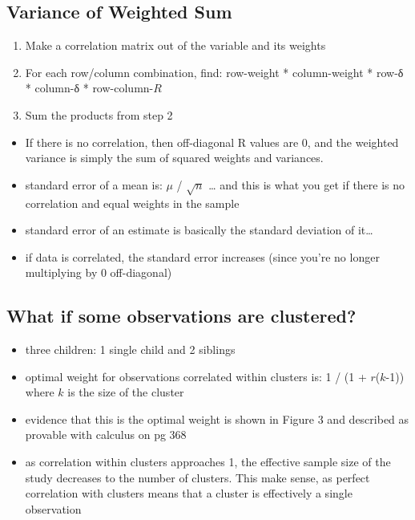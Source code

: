 \documentclass[
]{article}
\providecommand{\tightlist}{%
  \setlength{\itemsep}{0pt}\setlength{\parskip}{0pt}}
\begin{document}
\hypertarget{variance-of-weighted-sum}{%
\subsection{Variance of Weighted Sum}\label{variance-of-weighted-sum}}

\begin{enumerate}
\def\labelenumi{\arabic{enumi}.}
\tightlist
\item
  Make a correlation matrix out of the variable and its weights
\item
  For each row/column combination, find: row-weight * column-weight *
  row-δ * column-δ * row-column-\(R\)
\item
  Sum the products from step 2
\end{enumerate}

\begin{itemize}
\tightlist
\item
  If there is no correlation, then off-diagonal R values are 0, and the
  weighted variance is simply the sum of squared weights and variances.
\item
  standard error of a mean is: \(\mu\) / \(\sqrt{n}\) \ldots{} and this
  is what you get if there is no correlation and equal weights in the
  sample
\item
  standard error of an estimate is basically the standard deviation of
  it\ldots{}
\item
  if data is correlated, the standard error increases (since you're no
  longer multiplying by 0 off-diagonal)
\end{itemize}

\hypertarget{what-if-some-observations-are-clustered}{%
\subsection{What if some observations are
clustered?}\label{what-if-some-observations-are-clustered}}

\begin{itemize}
\tightlist
\item
  three children: 1 single child and 2 siblings
\item
  optimal weight for observations correlated within clusters is: 1 / (1
  + \(r\)(\(k\)-1)) where \(k\) is the size of the cluster
\item
  evidence that this is the optimal weight is shown in Figure 3 and
  described as provable with calculus on pg 368
\item
  as correlation within clusters approaches 1, the effective sample size
  of the study decreases to the number of clusters. This make sense, as
  perfect correlation with clusters means that a cluster is effectively
  a single observation
\end{itemize}
\end{document}
